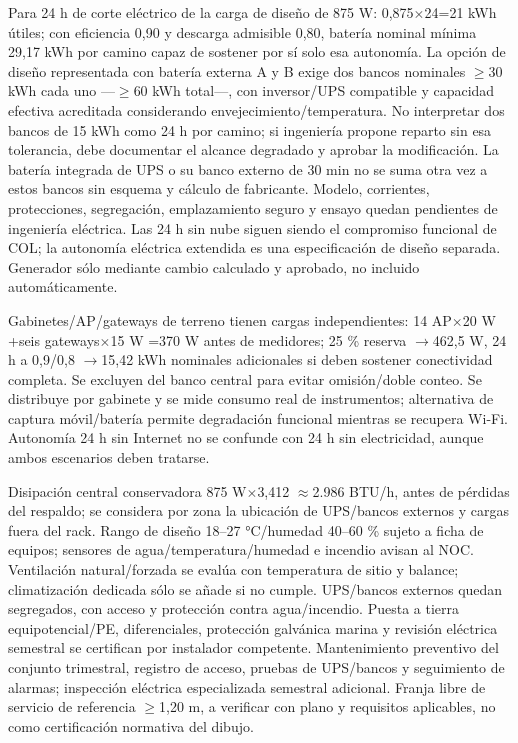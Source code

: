 \documentclass[11pt,letterpaper]{report}
\begin{document}
Para 24 h de corte eléctrico de la carga de diseño de 875 W: 0,875$\times$24=21 kWh útiles; con eficiencia 0,90 y descarga admisible 0,80, batería nominal mínima 29,17 kWh por camino capaz de sostener por sí solo esa autonomía. La opción de diseño representada con batería externa A y B exige dos bancos nominales $\geq$30 kWh cada uno ---$\geq$60 kWh total---, con inversor/UPS compatible y capacidad efectiva acreditada considerando envejecimiento/temperatura. No interpretar dos bancos de 15 kWh como 24 h por camino; si ingeniería propone reparto sin esa tolerancia, debe documentar el alcance degradado y aprobar la modificación. La batería integrada de UPS o su banco externo de 30 min no se suma otra vez a estos bancos sin esquema y cálculo de fabricante. Modelo, corrientes, protecciones, segregación, emplazamiento seguro y ensayo quedan pendientes de ingeniería eléctrica. Las 24 h sin nube siguen siendo el compromiso funcional de COL; la autonomía eléctrica extendida es una especificación de diseño separada. Generador sólo mediante cambio calculado y aprobado, no incluido automáticamente.

Gabinetes/AP/gateways de terreno tienen cargas independientes: 14 AP$\times$20 W +seis gateways$\times$15 W =370 W antes de medidores; 25 \% reserva $\rightarrow$462,5 W, 24 h a 0,9/0,8 $\rightarrow$15,42 kWh nominales adicionales si deben sostener conectividad completa. Se excluyen del banco central para evitar omisión/doble conteo. Se distribuye por gabinete y se mide consumo real de instrumentos; alternativa de captura móvil/batería permite degradación funcional mientras se recupera Wi-Fi. Autonomía 24 h sin Internet no se confunde con 24 h sin electricidad, aunque ambos escenarios deben tratarse.

Disipación central conservadora 875 W$\times$3,412 $\approx$2.986 BTU/h, antes de pérdidas del respaldo; se considera por zona la ubicación de UPS/bancos externos y cargas fuera del rack. Rango de diseño 18--27 °C/humedad 40--60 \% sujeto a ficha de equipos; sensores de agua/temperatura/humedad e incendio avisan al NOC. Ventilación natural/forzada se evalúa con temperatura de sitio y balance; climatización dedicada sólo se añade si no cumple. UPS/bancos externos quedan segregados, con acceso y protección contra agua/incendio. Puesta a tierra equipotencial/PE, diferenciales, protección galvánica marina y revisión eléctrica semestral se certifican por instalador competente. Mantenimiento preventivo del conjunto trimestral, registro de acceso, pruebas de UPS/bancos y seguimiento de alarmas; inspección eléctrica especializada semestral adicional. Franja libre de servicio de referencia $\geq$1,20 m, a verificar con plano y requisitos aplicables, no como certificación normativa del dibujo.
\end{document}
